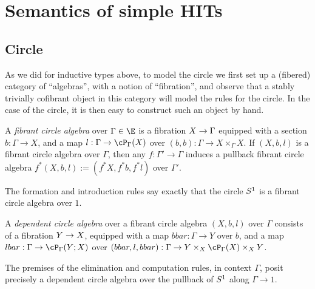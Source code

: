 \documentclass{amsart}
\begin{document}




\section{Semantics of simple HITs}

\subsection{Circle}

As we did for inductive types above, to model the circle we first set up a (fibered) category of “algebras”, with a notion of “fibration”, and observe that a stably trivially cofibrant object in this category will model the rules for the circle.
%
In the case of the circle, it is then easy to construct such an object by hand.

\begin{definition}
A \emph{fibrant circle algebra} over $\Gamma \in \E$ is a fibration $X \to \Gamma$ equipped with a section $b : \Gamma \to X$, and a map $l : \Gamma \to \paths[\Gamma]{X}$ over $(b,b) : \Gamma \to X \times_\Gamma X$.
%
If $(X,b,l)$ is a fibrant circle algebra over $\Gamma$, then any $f : \Gamma' \to \Gamma$ induces a pullback fibrant circle algebra $f^*(X,b,l) := (f^*X,f^*b,f^*l)$ over $\Gamma'$.
\end{definition}

The formation and introduction rules say exactly that the circle $S^1$ is a fibrant circle algebra over $1$.

\begin{definition}
A \emph{dependent circle algebra} over a fibrant circle algebra $(X,b,l)$ over $\Gamma$ consists of a fibration $Y \to X$, equipped with a map $bbar : \Gamma \to Y$ over $b$, and a map $lbar : \Gamma \to \pathsover[\Gamma]{X}{Y}$ over $(bbar,l,bbar) : \Gamma \to Y \times_X \paths[\Gamma]{X} \times_X Y$. 
\end{definition}

The premises of the elimination and computation rules, in context $\Gamma$, posit precisely a dependent circle algebra over the pullback of $S^1$ along $\Gamma \to 1$.
\end{document}

